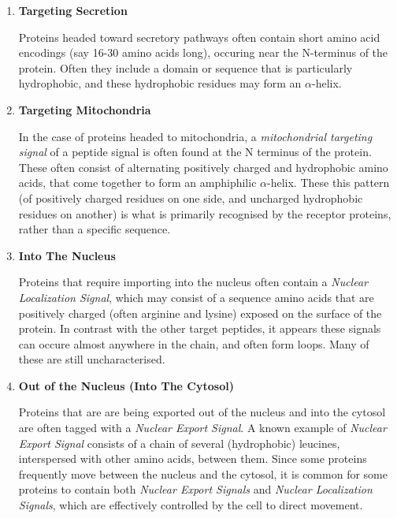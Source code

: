 \documentclass{bioinfo}
\begin{document}
\begin{enumerate}
  \item {\textbf{Targeting Secretion}} 

  Proteins headed toward secretory pathways often contain short amino acid encodings (say 16-30 amino acids long), occuring near the N-terminus of the protein. Often they include a domain or sequence that is particularly hydrophobic, and these hydrophobic residues may form an $\alpha$-helix. 

  \item {\textbf{Targeting Mitochondria}} 

  In the case of proteins headed to mitochondria, a \textit{mitochondrial targeting signal} of a peptide signal is often found at the N terminus of the protein. These often consist of alternating positively charged and hydrophobic amino acids, that come together to form an amphiphilic $\alpha$-helix. These this pattern (of positively charged residues on one side, and uncharged hydrophobic residues on another) is what is primarily recognised by the receptor proteins, rather than a specific sequence.

  \item {\textbf{Into The Nucleus}} 

  Proteins that require importing into the nucleus often contain a \textit{Nuclear Localization Signal}, which may consist of a sequence amino acids that are positively charged (often arginine and lysine) exposed on the surface of the protein. In contrast with the other target peptides, it appears these signals can occure almost anywhere in the chain, and often form loops. Many of these are still uncharacterised.  

   \item {\textbf{Out of the Nucleus (Into The Cytosol)}} 

  Proteins that are are being exported out of the nucleus and into the cytosol are often tagged with a \textit{Nuclear Export Signal}. 
  A known example of \textit{Nuclear Export Signal} consists of a chain of several (hydrophobic) leucines, interspersed with other amino acids, between them. 
  Since some proteins frequently move between the nucleus and the cytosol, it is common for some proteins to contain both  \textit{Nuclear Export Signals} and \textit{Nuclear Localization Signals}, which are effectively controlled by the cell to direct movement.



\end{enumerate} 
\end{document}
